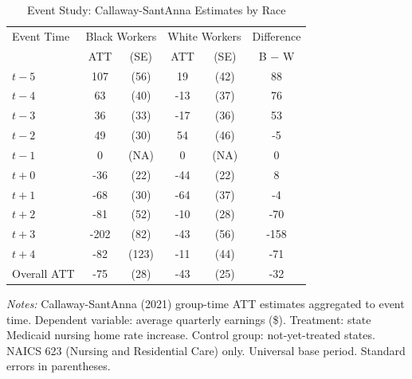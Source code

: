 
\begin{table}[t]
\centering
\caption{Event Study: Callaway-Sant\textquotesingle Anna Estimates by Race}
\label{tab:eventstudy}
\begin{threeparttable}
\begin{tabular}{lccccc}
\toprule
Event Time & \multicolumn{2}{c}{Black Workers} & \multicolumn{2}{c}{White Workers} & Difference \\
 & ATT & (SE) & ATT & (SE) & B $-$ W \\
\midrule
$t-5$ & 107 & (56) & 19 & (42) & 88 \\
$t-4$ & 63 & (40) & -13 & (37) & 76 \\
$t-3$ & 36 & (33) & -17 & (36) & 53 \\
$t-2$ & 49 & (30) & 54 & (46) & -5 \\
$t-1$ & 0 & (NA) & 0 & (NA) & 0 \\
$t+0$ & -36 & (22) & -44 & (22) & 8 \\
$t+1$ & -68 & (30) & -64 & (37) & -4 \\
$t+2$ & -81 & (52) & -10 & (28) & -70 \\
$t+3$ & -202 & (82) & -43 & (56) & -158 \\
$t+4$ & -82 & (123) & -11 & (44) & -71 \\
\midrule
Overall ATT & -75 & (28) & -43 & (25) & -32 \\
\bottomrule
\end{tabular}
\begin{tablenotes}[flushleft]
\small
\item \textit{Notes:} Callaway-Sant\textquotesingle Anna (2021) group-time ATT estimates aggregated to event time.
Dependent variable: average quarterly earnings (\$). Treatment: state Medicaid nursing home rate increase.
Control group: not-yet-treated states. NAICS 623 (Nursing and Residential Care) only.
Universal base period. Standard errors in parentheses.
\end{tablenotes}
\end{threeparttable}
\end{table}


